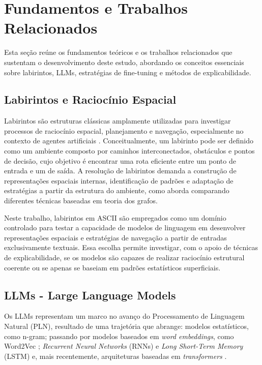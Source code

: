 \section{Fundamentos e Trabalhos Relacionados}\label{sec:fund-trabs-rel}

Esta seção reúne os fundamentos teóricos e os trabalhos relacionados que sustentam o desenvolvimento deste estudo, abordando os conceitos essenciais sobre labirintos, LLMs, estratégias de fine-tuning e métodos de explicabilidade.

\subsection{Labirintos e Raciocínio Espacial}

Labirintos são estruturas clássicas amplamente utilizadas para investigar processos de raciocínio espacial, planejamento e navegação, especialmente no contexto de agentes artificiais \cite{vartak2023mazesolverrobot}. Conceitualmente, um labirinto pode ser definido como um ambiente composto por caminhos interconectados, obstáculos e pontos de decisão, cujo objetivo é encontrar uma rota eficiente entre um ponto de entrada e um de saída. A resolução de labirintos demanda a construção de representações espaciais internas, identificação de padrões e adaptação de estratégias a partir da estrutura do ambiente, como \cite{sadik2010comprehensive} aborda comparando diferentes técnicas baseadas em teoria dos grafos.

Neste trabalho, labirintos em ASCII são empregados como um domínio controlado para testar a capacidade de modelos de linguagem em desenvolver representações espaciais e estratégias de navegação a partir de entradas exclusivamente textuais. Essa escolha permite investigar, com o apoio de técnicas de explicabilidade, se os modelos são capazes de realizar raciocínio estrutural coerente ou se apenas se baseiam em padrões estatísticos superficiais.

\subsection{LLMs - Large Language Models}

Os LLMs representam um marco no avanço do Processamento de Linguagem Natural (PLN), resultado de uma trajetória que abrange: modelos estatísticos, como n-gram; passando por modelos baseados em \textit{word embeddings}, como Word2Vec \cite{mikolov2013distributed}; \textit{Recurrent Neural Networks} (RNNs) e \textit{Long Short-Term Memory} (LSTM) \cite{hochreiter1997long} e, mais recentemente, arquiteturas baseadas em \textit{transformers} \cite{jurafsky2025slp3}.

